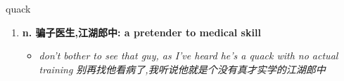 
\begin{frame}
{\huge quack}
\begin{center}
\begin{enumerate}\Large
  \item \textbf{n. 骗子医生,江湖郎中: a pretender to medical skill}
  \begin{itemize}
    \item \em{\Large{don't bother to see that guy, as I've heard he's a quack with no actual training 别再找他看病了,我听说他就是个没有真才实学的江湖郎中}}
  \end{itemize}
\end{enumerate}
\end{center}
\end{frame}
